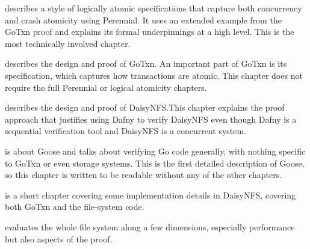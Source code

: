  describes a style of logically atomic specifications
that capture both concurrency and crash atomicity using Perennial. It uses an
extended example from the GoTxn proof and explains its formal underpinnings at a
high level. This is the most technically involved chapter.

 describes the design and proof of GoTxn. An important part of GoTxn is its
specification, which captures how transactions are atomic. This chapter does not
require the full Perennial or logical atomicity chapters.

 describes the design and proof of DaisyNFS.\@ This chapter
explains the proof approach that justifies using Dafny to verify DaisyNFS even
though Dafny is a sequential verification tool and DaisyNFS is a concurrent
system.

 is about Goose and talks about verifying Go code generally, with
nothing specific to GoTxn or even storage systems. This is the first detailed
description of Goose, so this chapter is written to be readable without any of
the other chapters.

 is a short chapter covering some implementation details in
DaisyNFS, covering both GoTxn and the file-system code.

 evaluates the whole file system along a few dimensions,
especially performance but also aspects of the proof.
